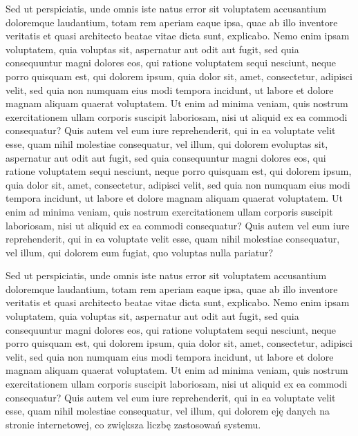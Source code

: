 \documentclass{mgr}
\begin{document}
Sed ut perspiciatis, unde omnis iste natus error sit voluptatem accusantium doloremque laudantium, totam rem aperiam eaque ipsa, quae ab illo inventore veritatis et quasi architecto beatae vitae dicta sunt, explicabo. Nemo enim ipsam voluptatem, quia voluptas sit, aspernatur aut odit aut fugit, sed quia consequuntur magni dolores eos, qui ratione voluptatem sequi nesciunt, neque porro quisquam est, qui dolorem ipsum, quia dolor sit, amet, consectetur, adipisci velit, sed quia non numquam eius modi tempora incidunt, ut labore et dolore magnam aliquam quaerat voluptatem. Ut enim ad minima veniam, quis nostrum exercitationem ullam corporis suscipit laboriosam, nisi ut aliquid ex ea commodi consequatur? Quis autem vel eum iure reprehenderit, qui in ea voluptate velit esse, quam nihil molestiae consequatur, vel illum, qui dolorem evoluptas sit, aspernatur aut odit aut fugit, sed quia consequuntur magni dolores eos, qui ratione voluptatem sequi nesciunt, neque porro quisquam est, qui dolorem ipsum, quia dolor sit, amet, consectetur, adipisci velit, sed quia non numquam eius modi tempora incidunt, ut labore et dolore magnam aliquam quaerat voluptatem. Ut enim ad minima veniam, quis nostrum exercitationem ullam corporis suscipit laboriosam, nisi ut aliquid ex ea commodi consequatur? Quis autem vel eum iure reprehenderit, qui in ea voluptate velit esse, quam nihil molestiae consequatur, vel illum, qui dolorem eum fugiat, quo voluptas nulla pariatur?

Sed ut perspiciatis, unde omnis iste natus error sit voluptatem accusantium doloremque laudantium, totam rem aperiam eaque ipsa, quae ab illo inventore veritatis et quasi architecto beatae vitae dicta sunt, explicabo. Nemo enim ipsam voluptatem, quia voluptas sit, aspernatur aut odit aut fugit, sed quia consequuntur magni dolores eos, qui ratione voluptatem sequi nesciunt, neque porro quisquam est, qui dolorem ipsum, quia dolor sit, amet, consectetur, adipisci velit, sed quia non numquam eius modi tempora incidunt, ut labore et dolore magnam aliquam quaerat voluptatem. Ut enim ad minima veniam, quis nostrum exercitationem ullam corporis suscipit laboriosam, nisi ut aliquid ex ea commodi consequatur? Quis autem vel eum iure reprehenderit, qui in ea voluptate velit esse, quam nihil molestiae consequatur, vel illum, qui dolorem eję danych na stronie
internetowej, co zwiększa liczbę zastosowań systemu.
 
\end{document}
